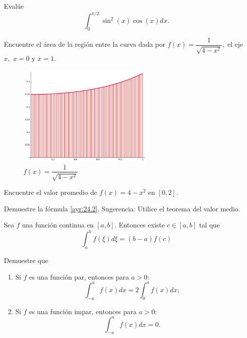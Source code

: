  \begin{problema}
  Evalúe $$\int_{0}^{\pi/2} \sin^{2}(x)\cos(x)dx.$$
 \end{problema}




 \begin{problema}
  Encuentre el área de la región entre la curva dada por $f(x)=\dfrac{1}{\sqrt{4-x^{2}}},$ el eje $x,$ $x=0$ y $x=1.$

 \end{problema}




 \begin{figure}
 \centering
 \includegraphics[height=5cm,keepaspectratio=true]{./calculo/sage0.png}
 \caption{$f(x)=\dfrac{1}{\sqrt{4-x^{2}}}$}
 \label{fig:solved:24.2}
\end{figure}




 \begin{problema}
  Encuentre el valor promedio de $f(x)=4-x^{2}$ en $[0,2].$
 \end{problema}




 \begin{problema}
  Demuestre la fórmula \eqref{ayr:24.2}. Sugerencia: Utilice el teorema del valor medio.
 \end{problema}




 \begin{teorema}
 Sea $f$ una función continua en $[a,b].$  Entonces existe $c\in[a,b]$ tal que
 \[
  \label{ayr:24.1}
  \int_{a}^{b}f(\xi)d\xi = \left( b-a \right)f(c)
 \]
\end{teorema}



 \begin{problema}
  Demuestre que
  \begin{enumerate}
   \item Si $f$ es una función par, entonces
   para $a>0:$
   $$
   \int_{-a}^{a}f(x)dx=2 \int_{0}^{a}f(x)dx;
   $$
   \item Si $f$ es una función impar, entonces
   para $a>0:$
   $$
   \int_{-a}^{a}f(x)dx=0.
   $$
  \end{enumerate}

 \end{problema}




